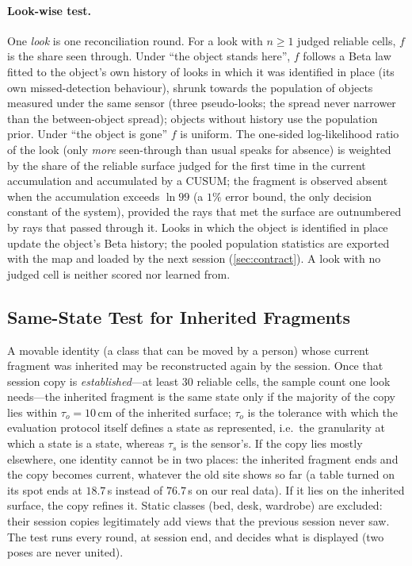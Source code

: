 \paragraph{Look-wise test.}
One \emph{look} is one reconciliation round. For a look with $n\ge 1$ judged
reliable cells, $f$ is the share seen through. Under ``the object stands here'',
$f$ follows a Beta law fitted to the object's own history of looks in which it
was identified in place (its own missed-detection behaviour), shrunk towards the
population of objects measured under the same sensor (three pseudo-looks; the
spread never narrower than the between-object spread); objects without history
use the population prior. Under ``the object is gone'' $f$ is uniform. The
one-sided log-likelihood ratio of the look (only \emph{more} seen-through than
usual speaks for absence) is weighted by the share of the reliable surface judged
for the first time in the current accumulation and accumulated by a CUSUM; the
fragment is observed absent when the accumulation exceeds $\ln 99$ (a $1\%$
error bound, the only decision constant of the system), provided the rays that
met the surface are outnumbered by rays that passed through it. Looks in which
the object is identified in place update the object's Beta history; the pooled
population statistics are exported with the map and loaded by the next session
(\cref{sec:contract}). A look with no judged cell is neither scored nor learned
from.

\subsection{Same-State Test for Inherited Fragments}
\label{sec:samestate}

A movable identity (a class that can be moved by a person) whose current
fragment was inherited may be reconstructed again by the session. Once that
session copy is \emph{established}---at least $30$ reliable cells, the sample
count one look needs---the inherited fragment is the same state only if the
majority of the copy lies within $\tau_o=10$\,cm of the inherited surface;
$\tau_o$ is the tolerance with which the evaluation protocol itself defines a
state as represented, i.e.\ the granularity at which a state is a state, whereas
$\tau_s$ is the sensor's. If the copy lies mostly elsewhere, one identity cannot
be in two places: the inherited fragment ends and the copy becomes current,
whatever the old site shows so far (a table turned on its spot ends at
$18.7$\,s instead of $76.7$\,s on our real data). If it lies on the inherited
surface, the copy refines it. Static classes (bed, desk, wardrobe) are excluded:
their session copies legitimately add views that the previous session never
saw. The test runs every round, at session end, and decides what is displayed
(two poses are never united).

